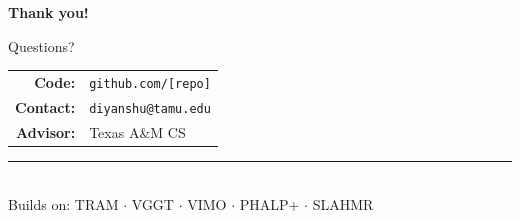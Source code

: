 \documentclass[aspectratio=169,11pt]{beamer}
\begin{document}
\begin{frame}[plain]
  \begin{center}
    \vspace{2em}
    {\LARGE\textcolor{tamumaroon}{\textbf{Thank you!}}}

    \vspace{1.5em}
    {\large Questions?}

    \vspace{2em}
    \begin{tabular}{rl}
      \textbf{Code:} & \texttt{github.com/[repo]} \\[0.3em]
      \textbf{Contact:} & \texttt{diyanshu@tamu.edu} \\[0.3em]
      \textbf{Advisor:} & Texas A\&M CS \\
    \end{tabular}

    \vspace{2em}
    \rule{0.5\linewidth}{0.4pt}\\[0.4em]
    {\small Builds on: TRAM $\cdot$ VGGT $\cdot$ VIMO $\cdot$ PHALP+ $\cdot$ SLAHMR}
  \end{center}
\end{frame}
\end{document}
